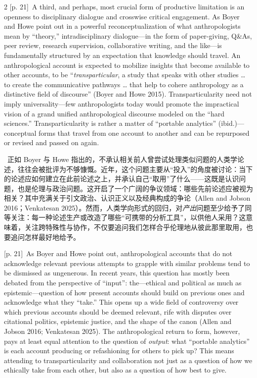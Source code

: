 \documentclass[10pt,a4paper]{article}
\begin{document}
\begin{paracol}{2}
\switchcolumn
{\scriptsize\color{gray} [p. 21]}\ A third, and perhaps, most crucial form of productive limitation is an openness to disciplinary dialogue and crosswise critical engagement. As Boyer and Howe point out in a powerful reconceptualization of what anthropologists mean by “theory,” intradisciplinary dialogue—in the form of paper-giving, Q\&As, peer review, research supervision, collaborative writing, and the like—is fundamentally structured by an expectation that knowledge should travel. An anthropological account is expected to mobilize insights that become available to other accounts, to be “\textit{transparticular}, a study that speaks with other studies … to create the communicative pathways … that help to cohere anthropology as a distinctive field of discourse” (Boyer and Howe 2015). Transparticularity need not imply universality—few anthropologists today would promote the impractical vision of a grand unified anthropological discourse modeled on the “hard sciences.” Transparticularity is rather a matter of “portable analytics” (ibid.)—conceptual forms that travel from one account to another and can be repurposed or revised and passed on again.\par
\switchcolumn*
{\scriptsize\color{gray} [p. 21]}\ 正如 Boyer 与 Howe 指出的，不承认相关前人曾尝试处理类似问题的人类学论述，往往会被批评为不够慷慨。近年，这个问题主要从“投入”的角度被讨论：当下的论述应如何建立在此前论述之上，并承认自己“取用”了什么——这既是认识问题，也是伦理与政治问题。这开启了一个广阔的争议领域：哪些先前论述应被视为相关？其中充满关于引文政治、认识正义以及经典构成的争论（Allen and Jobson 2016；Venkatesan 2025）。然而，人类学向形式的回归，对\textit{产出}问题至少给予了同等关注：每一种论述生产或改造了哪些“可携带的分析工具”，以供他人采用？这意味着，关注跨特殊性与协作，不仅要追问我们怎样合乎伦理地从彼此那里取用，也要追问怎样最好地给予。\par
\switchcolumn
{\scriptsize\color{gray} [p. 21]}\ As Boyer and Howe point out, anthropological accounts that do not acknowledge relevant previous attempts to grapple with similar problems tend to be dismissed as ungenerous. In recent years, this question has mostly been debated from the perspective of “input”: the—ethical and political as much as epistemic—question of how present accounts should build on previous ones and acknowledge what they “take.” This opens up a wide field of controversy over which previous accounts should be deemed relevant, rife with disputes over citational politics, epistemic justice, and the shape of the canon (Allen and Jobson 2016; Venkatesan 2025). The anthropological return to form, however, pays at least equal attention to the question of \textit{output}: what “portable analytics” is each account producing or refashioning for others to pick up? This means attending to transparticularity and collaboration not just as a question of how we ethically take from each other, but also as a question of how best to give.\par

\end{paracol}
\end{document}
